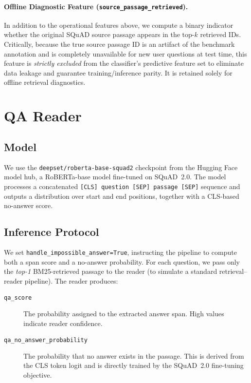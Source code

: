 \paragraph{Offline Diagnostic Feature (\texttt{source\_passage\_retrieved}).}
In addition to the operational features above, we compute a binary indicator
whether the original SQuAD source passage appears in the top-$k$ retrieved IDs.
Critically, because the true source passage ID is an artifact of the benchmark
annotation and is completely unavailable for new user questions at test time,
this feature is \emph{strictly excluded} from the classifier's predictive
feature set to eliminate data leakage and guarantee training/inference parity.
It is retained solely for offline retrieval diagnostics.

\section{QA Reader}
\label{sec:meth_reader}

\subsection{Model}

We use the \texttt{deepset/roberta-base-squad2} checkpoint from the
Hugging Face model hub, a RoBERTa-base \cite{liu2019roberta} model fine-tuned
on SQuAD~2.0. The model processes a concatenated \texttt{[CLS] question [SEP]
passage [SEP]} sequence and outputs a distribution over start and end positions,
together with a CLS-based no-answer score.

\subsection{Inference Protocol}

We set \texttt{handle\_impossible\_answer=True}, instructing the pipeline to
compute both a span score and a no-answer probability. For each question, we
pass only the \emph{top-1} BM25-retrieved passage to the reader (to simulate a
standard retrieval–reader pipeline). The reader produces:

\begin{description}
  \item[\texttt{qa\_score}] The probability assigned to the extracted answer
        span. High values indicate reader confidence.

  \item[\texttt{qa\_no\_answer\_probability}] The probability that no answer
        exists in the passage. This is derived from the CLS token logit and is
        directly trained by the SQuAD~2.0 fine-tuning objective.
\end{description}

